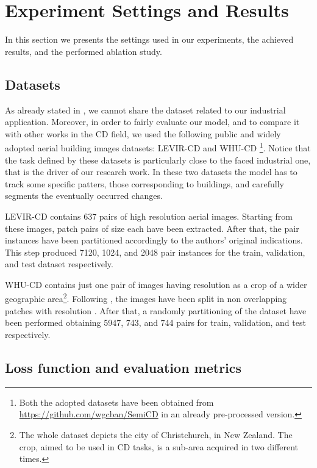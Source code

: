 \section{Experiment Settings and Results} \label{cap:results}

In this section we presents the settings used in our experiments, the achieved results, and the performed ablation study.


\subsection{Datasets}

As already stated in , we cannot share the dataset related to our industrial application.
Moreover, in order to fairly evaluate our model, and to compare it with other works in the CD field,
we used the following public and widely adopted aerial building images datasets: LEVIR-CD \cite{chen2020spatial} and WHU-CD \cite{ji2018fully}\footnote{
    Both the adopted datasets have been obtained from \url{https://github.com/wgcban/SemiCD} in an already pre-processed version.
}. 
Notice that the task defined by these datasets is particularly close to the faced industrial one, that is the driver of our research work.
In these two datasets the model has to track some specific patters, those corresponding to buildings, and carefully segments the eventually occurred changes.

LEVIR-CD contains 637 pairs of high resolution aerial images. 
Starting from these images, patch pairs of size  each have been extracted.
After that, the pair instances have been partitioned accordingly to the authors' original indications.
This step produced 7120, 1024, and 2048 pair instances for the train, validation, and test dataset respectively.

WHU-CD contains just one pair of images having resolution  as a crop of a wider geographic area\footnote{
    The whole dataset depicts the city of Christchurch, in New Zealand. 
    The crop, aimed to be used in CD tasks, is a sub-area acquired in two different times.
}.
Following \cite{bandara2022revisiting}, the images have been split in non overlapping patches with resolution .
After that, a randomly partitioning of the dataset have been performed obtaining 5947, 743, and 744 pairs for train, validation, and test respectively.

\subsection{Loss function and evaluation metrics}

